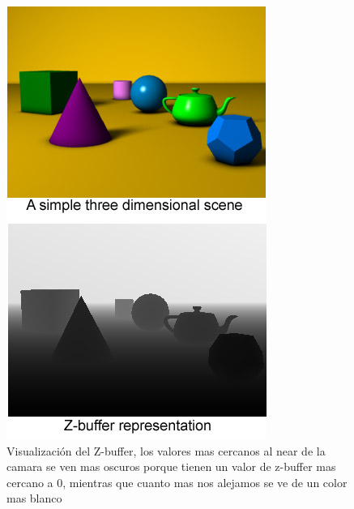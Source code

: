 \begin{figure}
\centering
\includegraphics{imagenes/Z-buffer.jpg}
\caption[Visualización del Z-buffer]{Visualización del Z-buffer, los valores mas cercanos al near de la camara se ven mas oscuros porque tienen un valor de z-buffer mas cercano a 0, mientras que cuanto mas nos alejamos se ve de un color mas blanco}

\end{figure}

